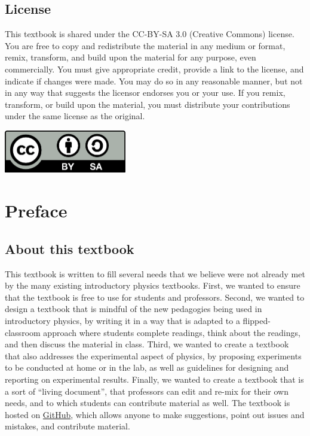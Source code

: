 \section*{License}
This textbook is shared under the CC-BY-SA 3.0 (Creative Commons) license. You are free to copy and redistribute the material in any medium or format, remix, transform, and build upon the material for any purpose, even commercially. You must give appropriate credit, provide a link to the license, and indicate if changes were made. You may do so in any reasonable manner, but not in any way that suggests the licensor endorses you or your use. If you remix, transform, or build upon the material, you must distribute your contributions under the same license as the original.
\vspace{\fill} 
\begin{center}
\includegraphics[width=0.4\textwidth]{figures/Preface/license.png}
\end{center}
\newpage

\chapter*{Preface}
\label{chap:ipreface}
\section*{About this textbook}
This textbook is written to fill several needs that we believe were not already met by the many existing introductory physics textbooks. First, we wanted to ensure that the textbook is free to use for students and professors. Second, we wanted to design a textbook that is mindful of the new pedagogies being used in introductory physics, by writing it in a way that is adapted to a flipped-classroom approach where students complete readings, think about the readings, and then discuss the material in class. Third, we wanted to create a textbook that also addresses the experimental aspect of physics, by proposing experiments to be conducted at home or in the lab, as well as guidelines for designing and reporting on experimental results. Finally, we wanted to create a textbook that is a sort of ``living document'', that professors can edit and re-mix for their own needs, and to which students can contribute material as well. The textbook is hosted on \href{https://github.com/OSTP/PhysicsArtofModelling}{GitHub}, which allows anyone to make suggestions, point out issues and mistakes, and contribute material.

